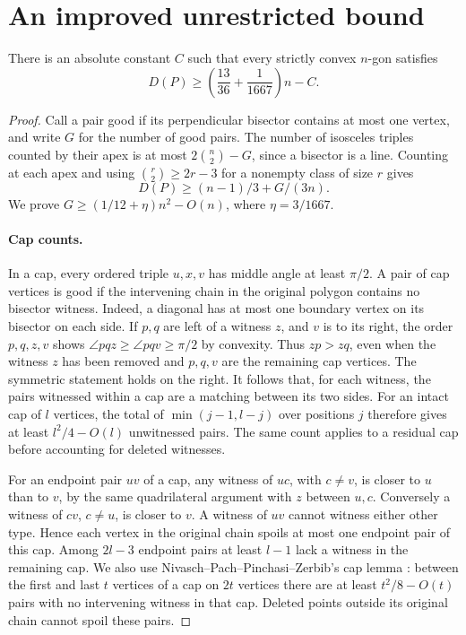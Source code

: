 \section{An improved unrestricted bound}

\begin{theorem}[982-G05]
There is an absolute constant \(C\) such that every strictly convex \(n\)-gon satisfies
\[
 D(P)\ge\left(\frac{13}{36}+\frac1{1667}\right)n-C.
\]
\end{theorem}

\begin{proof}
Call a pair good if its perpendicular bisector contains at most one vertex, and write \(G\) for the number of good pairs. The number of isosceles triples counted by their apex is at most \(2\binom n2-G\), since a bisector is a line. Counting at each apex and using \(\binom r2\ge2r-3\) for a nonempty class of size \(r\) gives
\[
 D(P)\ge(n-1)/3+G/(3n).
\]
We prove \(G\ge(1/12+\eta)n^2-O(n)\), where \(\eta=3/1667\).

\paragraph{Cap counts.}
In a cap, every ordered triple \(u,x,v\) has middle angle at least \(\pi/2\). A pair of cap vertices is good if the intervening chain in the original polygon contains no bisector witness. Indeed, a diagonal has at most one boundary vertex on its bisector on each side. If \(p,q\) are left of a witness \(z\), and \(v\) is to its right, the order \(p,q,z,v\) shows \(\angle pqz\ge\angle pqv\ge\pi/2\) by convexity. Thus \(zp>zq\), even when the witness \(z\) has been removed and \(p,q,v\) are the remaining cap vertices. The symmetric statement holds on the right. It follows that, for each witness, the pairs witnessed within a cap are a matching between its two sides. For an intact cap of \(l\) vertices, the total of \(\min(j-1,l-j)\) over positions \(j\) therefore gives at least \(l^2/4-O(l)\) unwitnessed pairs. The same count applies to a residual cap before accounting for deleted witnesses.

For an endpoint pair \(uv\) of a cap, any witness of \(uc\), with \(c\ne v\), is closer to \(u\) than to \(v\), by the same quadrilateral argument with \(z\) between \(u,c\). Conversely a witness of \(cv\), \(c\ne u\), is closer to \(v\). A witness of \(uv\) cannot witness either other type. Hence each vertex in the original chain spoils at most one endpoint pair of this cap. Among \(2l-3\) endpoint pairs at least \(l-1\) lack a witness in the remaining cap. We also use Nivasch--Pach--Pinchasi--Zerbib's cap lemma \cite[Lemma 12]{nppz}: between the first and last \(t\) vertices of a cap on \(2t\) vertices there are at least \(t^2/8-O(t)\) pairs with no intervening witness in that cap. Deleted points outside its original chain cannot spoil these pairs.


\end{proof}

